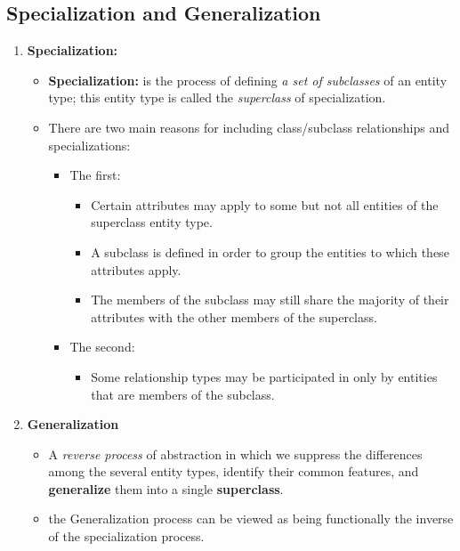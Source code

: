 \documentclass[10pt]{article}
\newcommand{\tf}{\textbf}
\newcommand{\ti}{\textit}
\begin{document}
\subsection{Specialization and Generalization}
\begin{enumerate}
	\item \tf{Specialization: }
	\begin{itemize}
		\item \tf{Specialization:} is the process of defining \ti{a set of subclasses} of an entity type; this entity type is called the \ti{superclass} of specialization.
		\item There are two main reasons for including class/subclass relationships and specializations:
		\begin{itemize}
			\item The first:
			\begin{itemize}
				\item Certain attributes may apply to some but not all entities of the superclass entity type.
				\item A subclass is defined in order to group the entities to which these attributes apply.
				\item The members of the subclass may still share the majority of their attributes with the other members of the superclass.
			\end{itemize}

			\item The second:
			\begin{itemize}
				\item Some relationship types may be participated in only by entities that are members of the subclass.  
			\end{itemize}
		\end{itemize}
	\end{itemize}

	\item \tf{Generalization}
	\begin{itemize}
		\item A \ti{reverse process} of abstraction in which we suppress the differences among the several entity types, identify their common features, and \tf{generalize} them into a single \tf{superclass}.
		\item the Generalization process can be viewed as being functionally the inverse of the specialization process.
	\end{itemize}
\end{enumerate}
\end{document}
